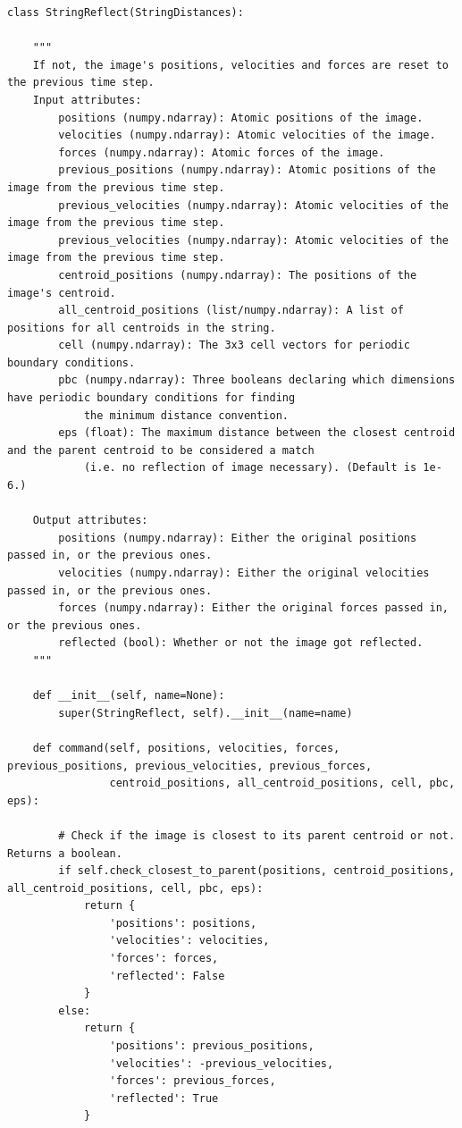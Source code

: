 \documentclass{article}
\begin{document}
\begin{lstlisting}
class StringReflect(StringDistances):

    """
    If not, the image's positions, velocities and forces are reset to the previous time step.
    Input attributes:
        positions (numpy.ndarray): Atomic positions of the image.
        velocities (numpy.ndarray): Atomic velocities of the image.
        forces (numpy.ndarray): Atomic forces of the image.
        previous_positions (numpy.ndarray): Atomic positions of the image from the previous time step.
        previous_velocities (numpy.ndarray): Atomic velocities of the image from the previous time step.
        previous_velocities (numpy.ndarray): Atomic velocities of the image from the previous time step.
        centroid_positions (numpy.ndarray): The positions of the image's centroid.
        all_centroid_positions (list/numpy.ndarray): A list of positions for all centroids in the string.
        cell (numpy.ndarray): The 3x3 cell vectors for periodic boundary conditions.
        pbc (numpy.ndarray): Three booleans declaring which dimensions have periodic boundary conditions for finding
            the minimum distance convention.
        eps (float): The maximum distance between the closest centroid and the parent centroid to be considered a match
            (i.e. no reflection of image necessary). (Default is 1e-6.)

    Output attributes:
        positions (numpy.ndarray): Either the original positions passed in, or the previous ones.
        velocities (numpy.ndarray): Either the original velocities passed in, or the previous ones.
        forces (numpy.ndarray): Either the original forces passed in, or the previous ones.
        reflected (bool): Whether or not the image got reflected.
    """
    
    def __init__(self, name=None):
        super(StringReflect, self).__init__(name=name)

    def command(self, positions, velocities, forces, previous_positions, previous_velocities, previous_forces,
                centroid_positions, all_centroid_positions, cell, pbc, eps):
        
        # Check if the image is closest to its parent centroid or not. Returns a boolean.
        if self.check_closest_to_parent(positions, centroid_positions, all_centroid_positions, cell, pbc, eps):
            return {
                'positions': positions,
                'velocities': velocities,
                'forces': forces,
                'reflected': False
            }
        else:
            return {
                'positions': previous_positions,
                'velocities': -previous_velocities,
                'forces': previous_forces,
                'reflected': True
            }
\end{lstlisting}
\end{document}
